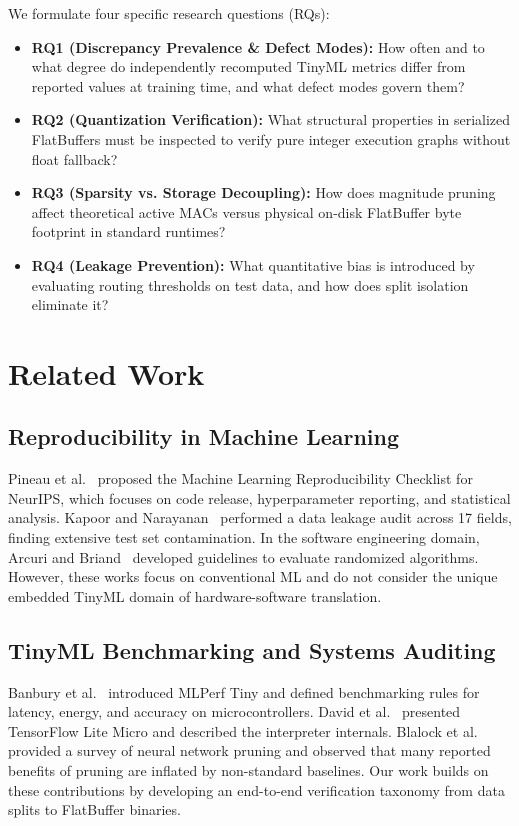 \documentclass[journal]{IEEEtran}
\begin{document}
We formulate four specific research questions (RQs):
\begin{itemize}
    \item \textbf{RQ1 (Discrepancy Prevalence \& Defect Modes):} How often and to what degree do independently recomputed TinyML metrics differ from reported values at training time, and what defect modes govern them?
    \item \textbf{RQ2 (Quantization Verification):} What structural properties in serialized FlatBuffers must be inspected to verify pure integer execution graphs without float fallback?
    \item \textbf{RQ3 (Sparsity vs. Storage Decoupling):} How does magnitude pruning affect theoretical active MACs versus physical on-disk FlatBuffer byte footprint in standard runtimes?
    \item \textbf{RQ4 (Leakage Prevention):} What quantitative bias is introduced by evaluating routing thresholds on test data, and how does split isolation eliminate it?
\end{itemize}

\section{Related Work}
\subsection{Reproducibility in Machine Learning}
Pineau et al.~\cite{pineau2021improving} proposed the Machine Learning Reproducibility Checklist for NeurIPS, which focuses on code release, hyperparameter reporting, and statistical analysis. Kapoor and Narayanan~\cite{kapoor2023leakage} performed a data leakage audit across 17 fields, finding extensive test set contamination. In the software engineering domain, Arcuri and Briand~\cite{arcuri2014hitchhiker} developed guidelines to evaluate randomized algorithms. However, these works focus on conventional ML and do not consider the unique embedded TinyML domain of hardware-software translation.

\subsection{TinyML Benchmarking and Systems Auditing}
Banbury et al.~\cite{banbury2021benchmarking} introduced MLPerf Tiny and defined benchmarking rules for latency, energy, and accuracy on microcontrollers. David et al.~\cite{david2021tensorflow} presented TensorFlow Lite Micro and described the interpreter internals. Blalock et al.~\cite{blalock2020state} provided a survey of neural network pruning and observed that many reported benefits of pruning are inflated by non-standard baselines. Our work builds on these contributions by developing an end-to-end verification taxonomy from data splits to FlatBuffer binaries.
\end{document}
